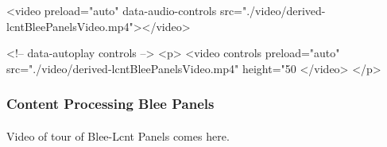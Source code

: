 \begin{whenOrg}
\begin{htmlonly}

\begin{frame}[fragile,plain,label=lcntBleePanelsVideo]
    \frametitle{}
    \framesubtitle{}
    \begin{presentationMode}
    \begin{rawhtml}
<video preload="auto" data-audio-controls src="./video/derived-lcntBleePanelsVideo.mp4"></video>
    \end{rawhtml}
    \end{presentationMode}

    \begin{articleMode}
    \begin{rawhtml}
    <!-- data-autoplay  controls -->
    <p>
    <video controls  preload="auto" src="./video/derived-lcntBleePanelsVideo.mp4" height="50%
    </video>
    </p>
     \end{rawhtml}
    \end{articleMode}
\end{frame}
\end{htmlonly}

\begin{verblatex}

\begin{frame}[fragile,plain,label=lcntBleePanelsVideo]
    \frametitle{Content Processing Blee Panels}
    \framesubtitle{}


    \begin{center}
    Video of tour of Blee-Lcnt Panels comes here.
    \end{center}



\end{frame}
\end{verblatex}
\end{whenOrg}
